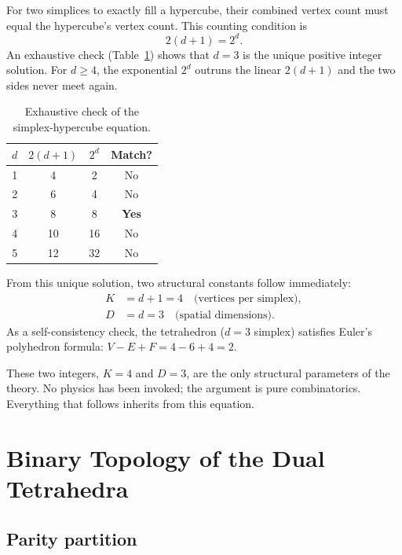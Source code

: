\documentclass[twocolumn]{iopjournal}
\begin{document}
For two simplices to exactly fill a hypercube, their combined vertex count must equal the hypercube's vertex count. This counting condition is
\begin{equation}
2(d+1) = 2^d.
\label{eq:uniqueness}
\end{equation}
An exhaustive check (Table~\ref{tab:dcheck}) shows that $d = 3$ is the unique positive integer solution. For $d \geq 4$, the exponential $2^d$ outruns the linear $2(d+1)$ and the two sides never meet again.

\begin{table}[h]
\centering
\caption{Exhaustive check of the simplex-hypercube equation.}
\label{tab:dcheck}
\begin{tabular}{cccc}
\hline
$d$ & $2(d+1)$ & $2^d$ & Match? \\
\hline
1 & 4 & 2 & No \\
2 & 6 & 4 & No \\
3 & 8 & 8 & \textbf{Yes} \\
4 & 10 & 16 & No \\
5 & 12 & 32 & No \\
\hline
\end{tabular}
\end{table}

From this unique solution, two structural constants follow immediately:
\begin{align}
K &= d + 1 = 4 \quad \text{(vertices per simplex)}, \nonumber \\
D &= d = 3 \quad \text{(spatial dimensions)}.
\end{align}
As a self-consistency check, the tetrahedron ($d = 3$ simplex) satisfies Euler's polyhedron formula: $V - E + F = 4 - 6 + 4 = 2$.

These two integers, $K = 4$ and $D = 3$, are the only structural parameters of the theory. No physics has been invoked; the argument is pure combinatorics. Everything that follows inherits from this equation.


\section{Binary Topology of the Dual Tetrahedra}
\label{sec:topology}

\subsection{Parity partition}
\end{document}
